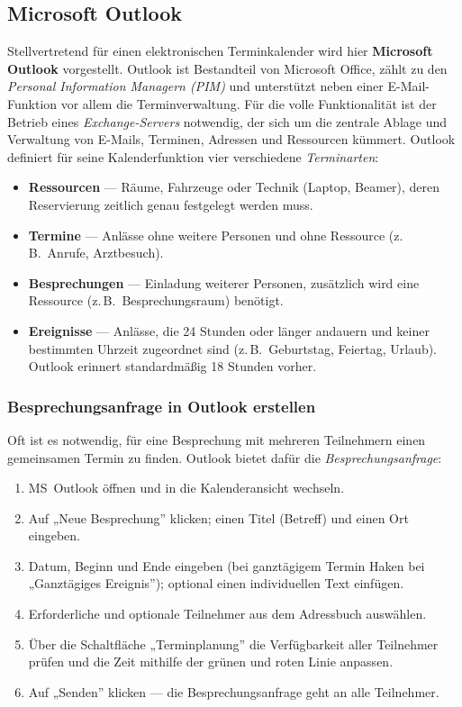 \documentclass[11pt, a4paper]{article}
\begin{document}
\subsection{Microsoft Outlook}

Stellvertretend für einen elektronischen Terminkalender wird hier \textbf{Microsoft
Outlook} vorgestellt. Outlook ist Bestandteil von Microsoft Office, zählt zu den
\emph{Personal Information Managern (PIM)} und unterstützt neben einer E-Mail-Funktion
vor allem die Terminverwaltung. Für die volle Funktionalität ist der Betrieb eines
\emph{Exchange-Servers} notwendig, der sich um die zentrale Ablage und Verwaltung von
E-Mails, Terminen, Adressen und Ressourcen kümmert. Outlook definiert für seine
Kalenderfunktion vier verschiedene \emph{Terminarten}:

\begin{itemize}
  \item \textbf{Ressourcen} --- Räume, Fahrzeuge oder Technik (Laptop, Beamer), deren
    Reservierung zeitlich genau festgelegt werden muss.
  \item \textbf{Termine} --- Anlässe ohne weitere Personen und ohne Ressource
    (z.\,B.\ Anrufe, Arztbesuch).
  \item \textbf{Besprechungen} --- Einladung weiterer Personen, zusätzlich wird eine
    Ressource (z.\,B.\ Besprechungsraum) benötigt.
  \item \textbf{Ereignisse} --- Anlässe, die 24 Stunden oder länger andauern und keiner
    bestimmten Uhrzeit zugeordnet sind (z.\,B.\ Geburtstag, Feiertag, Urlaub). Outlook
    erinnert standardmäßig 18 Stunden vorher.
\end{itemize}

\subsubsection{Besprechungsanfrage in Outlook erstellen}

Oft ist es notwendig, für eine Besprechung mit mehreren Teilnehmern einen gemeinsamen
Termin zu finden. Outlook bietet dafür die \emph{Besprechungsanfrage}:

\begin{enumerate}
  \item MS~Outlook öffnen und in die Kalenderansicht wechseln.
  \item Auf „Neue Besprechung” klicken; einen Titel (Betreff) und einen Ort eingeben.
  \item Datum, Beginn und Ende eingeben (bei ganztägigem Termin Haken bei „Ganztägiges
    Ereignis”); optional einen individuellen Text einfügen.
  \item Erforderliche und optionale Teilnehmer aus dem Adressbuch auswählen.
  \item Über die Schaltfläche „Terminplanung” die Verfügbarkeit aller Teilnehmer prüfen
    und die Zeit mithilfe der grünen und roten Linie anpassen.
  \item Auf „Senden” klicken --- die Besprechungsanfrage geht an alle Teilnehmer.
\end{enumerate}
\end{document}
